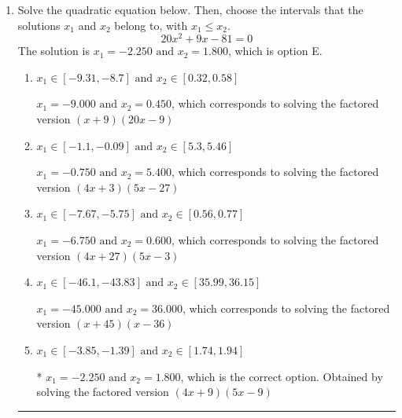\documentclass{extbook}[14pt]
\newcommand{\litem}[1]{\item #1

\rule{\textwidth}{0.4pt}}
\begin{document}
\begin{enumerate}\litem{
Solve the quadratic equation below. Then, choose the intervals that the solutions $x_1$ and $x_2$ belong to, with $x_1 \leq x_2$.
\[ 20x^{2} +9 x -81 = 0 \]The solution is \( x_1 = -2.250 \text{ and } x_2 = 1.800 \), which is option E.\begin{enumerate}[label=\Alph*.]
\item \( x_1 \in [-9.31, -8.7] \text{ and } x_2 \in [0.32, 0.58] \)

$x_1 = -9.000 \text{ and } x_2 = 0.450$, which corresponds to solving the factored version $(x + 9)(20x -9)$
\item \( x_1 \in [-1.1, -0.09] \text{ and } x_2 \in [5.3, 5.46] \)

$x_1 = -0.750 \text{ and } x_2 = 5.400$, which corresponds to solving the factored version $(4x + 3)(5x -27)$
\item \( x_1 \in [-7.67, -5.75] \text{ and } x_2 \in [0.56, 0.77] \)

$x_1 = -6.750 \text{ and } x_2 = 0.600$, which corresponds to solving the factored version $(4x + 27)(5x -3)$
\item \( x_1 \in [-46.1, -43.83] \text{ and } x_2 \in [35.99, 36.15] \)

$x_1 = -45.000 \text{ and } x_2 = 36.000$, which corresponds to solving the factored version $(x + 45)(x -36)$
\item \( x_1 \in [-3.85, -1.39] \text{ and } x_2 \in [1.74, 1.94] \)

* $x_1 = -2.250 \text{ and } x_2 = 1.800$, which is the correct option. Obtained by solving the factored version $(4x + 9)(5x -9)$
\end{enumerate}

}
\end{enumerate}
\end{document}
